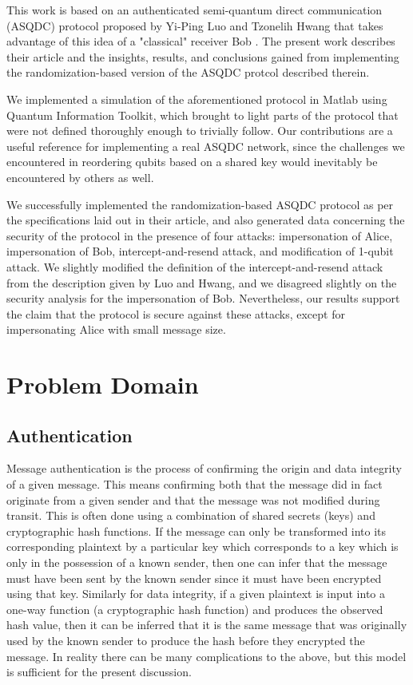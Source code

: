 \documentclass[conference]{IEEEtran}
\begin{document}
This work is based on an authenticated semi-quantum direct communication (ASQDC) protocol
proposed by Yi-Ping Luo and Tzonelih Hwang that takes advantage of this idea
of a "classical" receiver Bob \cite{LuoHwang}.
The present work describes their article and the insights,
results, and conclusions gained from implementing the randomization-based version
of the ASQDC protcol described therein.

We implemented a simulation of the aforementioned protocol in Matlab
using Quantum Information Toolkit, which brought to light parts of the
protocol that were not defined thoroughly enough to trivially follow.
Our contributions are a useful reference for implementing a real ASQDC
network, since the challenges we encountered in reordering qubits based
on a shared key would inevitably be encountered by others as well.

We successfully implemented the randomization-based ASQDC
protocol as per the specifications laid out in their article,
and also generated data concerning the security of the protocol
in the presence of four attacks: impersonation of Alice, impersonation
of Bob, intercept-and-resend attack, and modification of 1-qubit attack.
We slightly modified the definition of the intercept-and-resend attack
from the description given by Luo and Hwang, and we disagreed slightly on the
security analysis for the impersonation of Bob. Nevertheless, our
results support the claim that the protocol is secure against these
attacks, except for impersonating Alice with small message size.

\section{Problem Domain}

\subsection{Authentication}

Message authentication is the process of confirming the origin and
data integrity of a given message. This means confirming both that the
message did in fact originate from a given sender and that the message
was not modified during transit. This is often done using a combination of
shared secrets (keys) and cryptographic hash functions. If the message
can only be transformed into its corresponding plaintext by a particular key
which corresponds to a key which is only in the possession
of a known sender, then one can infer that the message must have been
sent by the known sender since it must have been encrypted using that
key. Similarly for data integrity, if a given plaintext is input
into a one-way function (a cryptographic hash function) and produces
the observed hash value, then it can be inferred that it is the same
message that was originally used by the known sender to produce the
hash before they encrypted the message. In reality there
can be many complications to the above, but this model is sufficient
for the present discussion.
\end{document}
